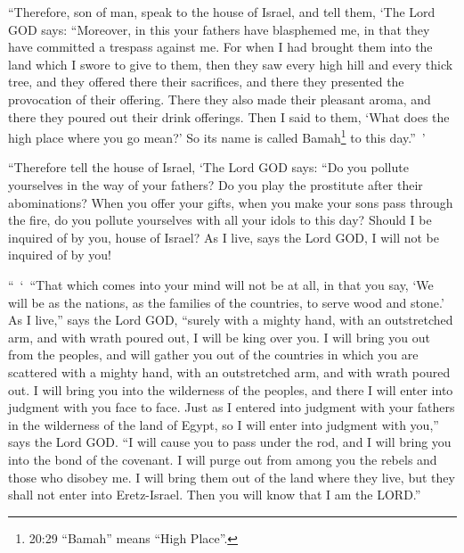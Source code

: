\myverse{}“Therefore, son of man, speak to the house of Israel, and tell
them, ‘The Lord GOD says: “Moreover, in this your fathers have blasphemed me, in that they have committed
a trespass against me.
\myverse{}For when I had brought them into the land which I swore to give to them,
then they saw every high hill and every thick tree, and they offered there their sacrifices, and there
they presented the provocation of their offering. There they also made their pleasant aroma, and there
they poured out their drink offerings.
\myverse{}Then I said to them, ‘What does the high place where you go mean?’ So its
name is called Bamah\footnote{20:29 “Bamah” means “High Place”.} to this day.” ’

\myverse{}“Therefore tell the house of Israel, ‘The Lord GOD says: “Do
you pollute yourselves in the way of your fathers? Do you play the prostitute after their abominations?
\myverse{}When you offer your gifts, when you make your sons pass through the fire,
do you pollute yourselves with all your idols to this day? Should I be inquired of by you, house of Israel?
As I live, says the Lord GOD, I will not be inquired of by you!

\myverse{}“ ‘ “That which comes into your mind will not be at all, in that
you say, ‘We will be as the nations, as the families of the countries, to serve wood and stone.’
\myverse{}As I live,” says the Lord GOD, “surely with a mighty hand, with an outstretched
arm, and with wrath poured out, I will be king over you.
\myverse{}I will bring you out from the peoples, and will gather you out of the countries
in which you are scattered with a mighty hand, with an outstretched arm, and with wrath poured out.
\myverse{}I will bring you into the wilderness of the peoples, and there I will enter
into judgment with you face to face.
\myverse{}Just as I entered into judgment with your fathers in the wilderness of the
land of Egypt, so I will enter into judgment with you,” says the Lord GOD.
\myverse{}“I will cause you to pass under the rod, and I will bring you into the bond
of the covenant.
\myverse{}I will purge out from among you the rebels and those who disobey me. I will
bring them out of the land where they live, but they shall not enter into Eretz-Israel. Then you will
know that I am the LORD.”

